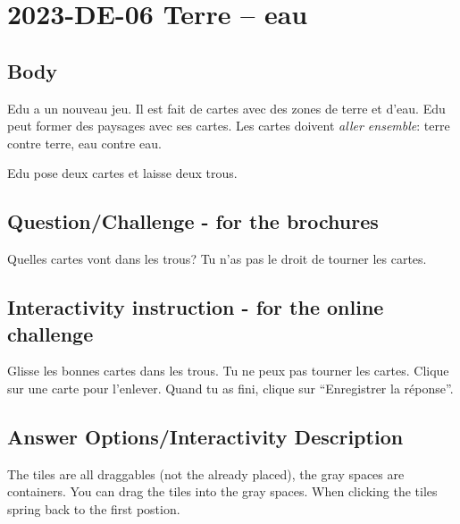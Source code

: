 \documentclass[a4paper,11pt]{report}
\newcommand{\taskGraphicsFolder}{..}
\begin{document}
\section*{\centering{} 2023-DE-06 Terre – eau}


\subsection*{Body}

Edu a un nouveau jeu. Il est fait de cartes avec des zones de terre et d’eau. Edu peut former des paysages avec ses cartes. Les cartes doivent \emph{aller ensemble}: terre contre terre, eau contre eau.

{\centering%
\raisebox{-0.5ex}{}
\raisebox{-0.5ex}{}\par}

Edu pose deux cartes et laisse deux trous.

{\em


\subsection*{Question/Challenge - for the brochures}

Quelles cartes vont dans les trous? Tu n’as pas le droit de tourner les cartes.

{\centering%
\par}

}


\subsection*{Interactivity instruction - for the online challenge}

Glisse les bonnes cartes dans les trous. Tu ne peux pas tourner les cartes. Clique sur une carte pour l’enlever. Quand tu as fini, clique sur “Enregistrer la réponse”.

\begingroup
\renewcommand{\arraystretch}{1.5}
\subsection*{Answer Options/Interactivity Description}

The tiles are all draggables (not the already placed), the gray spaces are containers. You can drag the tiles into the gray spaces. When clicking the tiles spring back to the first postion.
\end{document}
